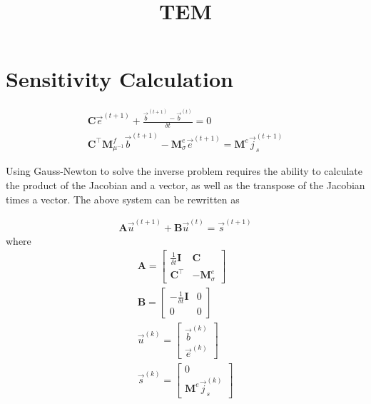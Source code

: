 \documentclass[]{article}
\newcommand{\dcurl}{\ensuremath{{\mathbf C}}}
\newcommand{\M}{\ensuremath{{\mathbf M}}}
\newcommand{\MfMui}{\ensuremath{{\M^f_{\mu^{-1}}}}}
\newcommand{\MeSig}{\ensuremath{{\M^e_\sigma}}}
\newcommand{\Me}{\ensuremath{{\M^e}}}
\newcommand{\s}{\vec{s}}
\renewcommand {\j}  { {\vec j} }
\renewcommand {\b}  { {\vec b} }
\newcommand {\e}  { {\vec e} }
\renewcommand {\u}  { {\vec u} }
\begin{document}
\title{TEM}

\section{Sensitivity Calculation}

\begin{subequations}
    \begin{align}
        \dcurl \e^{(t+1)} + \frac{\b^{(t+1)} - \b^{(t)}}{\delta t} = 0 \\
        \dcurl^\top \MfMui \b^{(t+1)} - \MeSig \e^{(t+1)} = \Me \j_s^{(t+1)}
    \end{align}
\end{subequations}

Using Gauss-Newton to solve the inverse problem requires the ability to calculate the product of the Jacobian and a vector, as well as the transpose of the Jacobian times a vector. The above system can be rewritten as

\begin{align}
    \mathbf{A} \u^{(t+1)} + \mathbf{B} \u^{(t)}= \s^{(t+1)}
\end{align}
where
\begin{subequations}
    \begin{align}
        \mathbf{A} = 
        \left[
            \begin{array}{cc}
                \frac{1}{\delta t} \mathbf{I} & \dcurl \\
                \dcurl^\top & -\MeSig
            \end{array}
        \right] \\
        \mathbf{B} = 
        \left[
            \begin{array}{cc}
                -\frac{1}{\delta t} \mathbf{I} & 0 \\
                0 & 0
            \end{array}
        \right] \\
        \u^{(k)} = \left[ 
        \begin{array}{c}
            \b^{(k)}\\
            \e^{(k)}
        \end{array}
        \right] \\
        \s^{(k)} = \left[ 
        \begin{array}{c}
            0\\
            \Me \j^{(k)}_s
        \end{array}
        \right]
    \end{align}
\end{subequations}
\end{document}
